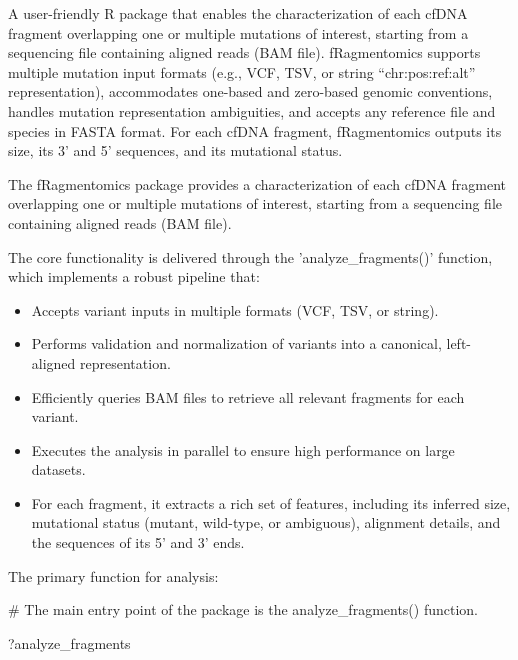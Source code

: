 \documentclass[a4paper]{book}
\begin{document}
\begin{Description}
A user-friendly R package that enables the characterization
of each cfDNA fragment overlapping one or multiple mutations of interest,
starting from a sequencing file containing aligned reads (BAM file).
fRagmentomics supports multiple mutation input formats (e.g., VCF, TSV,
or string “chr:pos:ref:alt” representation), accommodates one-based and
zero-based genomic conventions, handles mutation representation ambiguities,
and accepts any reference file and species in FASTA format. For each cfDNA
fragment, fRagmentomics outputs its size, its 3’ and 5’ sequences, and its
mutational status.

The fRagmentomics package provides a characterization of each cfDNA fragment overlapping one or multiple mutations
of interest, starting from a sequencing file containing aligned reads (BAM file).

The core functionality is delivered through the 'analyze\_fragments()'
function, which implements a robust pipeline that:
\begin{itemize}

\item{} Accepts variant inputs in multiple formats (VCF, TSV, or string).
\item{} Performs validation and normalization of variants into a canonical, left-aligned representation.
\item{} Efficiently queries BAM files to retrieve all relevant fragments for each variant.
\item{} Executes the analysis in parallel to ensure high performance on large datasets.
\item{} For each fragment, it extracts a rich set of features, including its inferred size, mutational status
(mutant, wild-type, or ambiguous), alignment details, and the sequences of its 5' and 3' ends.

\end{itemize}

\end{Description}
%
\begin{SeeAlso}
The primary function for analysis: 
\end{SeeAlso}
%
\begin{Examples}
\begin{ExampleCode}
# The main entry point of the package is the analyze_fragments() function.

?analyze_fragments

\end{ExampleCode}
\end{Examples}
\end{document}

